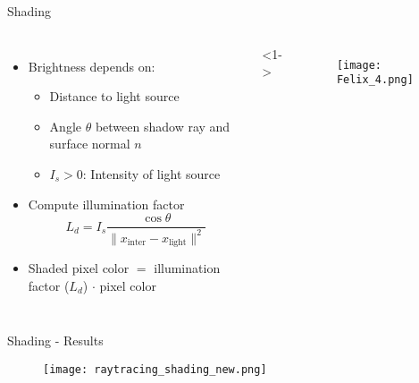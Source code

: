 \begin{frame}{Shading}
    \begin{columns}
        \begin{itemize}
        \item<1-> Brightness depends on: 
        \begin{itemize}
            \item Distance to light source
            \item Angle $\theta$ between shadow ray and surface normal $n$
            \item $I_s > 0$: Intensity of light source
        \end{itemize}
        \item<2-> Compute illumination factor
        $$
        L_d = I_s \frac{\cos \theta}{\|x_{\text{inter}} - x_{\text{light}}\|^2}
        $$
        \item<3-> Shaded pixel color $=$ illumination factor ($L_d$) $\cdot$ pixel color
        \end{itemize}
        <1->
        \begin{figure}
                \centering
                \texttt{[image: Felix\_4.png]}
            \end{figure}
    \end{columns}
\end{frame}

\begin{frame}{Shading - Results}
    \begin{figure}
                \centering
                \texttt{[image: raytracing\_shading\_new.png]}
            \end{figure}
\end{frame}


